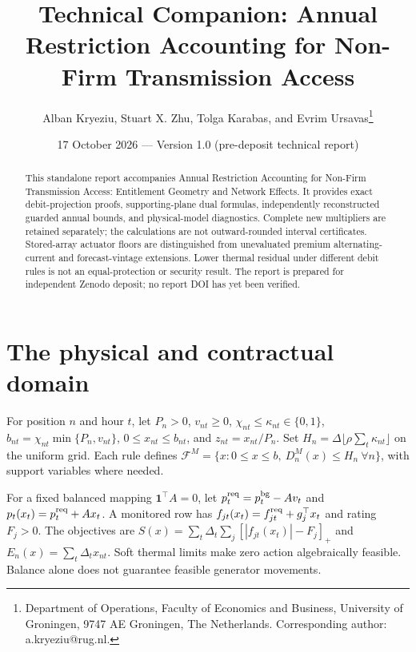 \documentclass[11pt]{article}
\title{Technical Companion: Annual Restriction Accounting for Non-Firm Transmission Access}
\author{Alban Kryeziu, Stuart X. Zhu, Tolga Karabas, and Evrim Ursavas\thanks{Department of Operations, Faculty of Economics and Business, University of Groningen, 9747 AE Groningen, The Netherlands. Corresponding author: a.kryeziu@rug.nl.}}
\date{17 October 2026 --- Version 1.0 (pre-deposit technical report)}
\newcommand{\one}{\mathbf1}
\newcommand{\F}{\mathcal F}
\begin{document}
\maketitle
\begin{abstract}
This standalone report accompanies Annual Restriction Accounting for Non-Firm Transmission Access: Entitlement Geometry and Network Effects. It provides exact debit-projection proofs, supporting-plane dual formulas, independently reconstructed guarded annual bounds, and physical-model diagnostics. Complete new multipliers are retained separately; the calculations are not outward-rounded interval certificates. Stored-array actuator floors are distinguished from unevaluated premium alternating-current and forecast-vintage extensions. Lower thermal residual under different debit rules is not an equal-protection or security result. The report is prepared for independent Zenodo deposit; no report DOI has yet been verified.
\end{abstract}
\section{The physical and contractual domain}
For position $n$ and hour $t$, let $P_n>0$, $v_{nt}\geq0$, $\chi_{nt}\leq\kappa_{nt}\in\{0,1\}$, $b_{nt}=\chi_{nt}\min\{P_n,v_{nt}\}$, $0\leq x_{nt}\leq b_{nt}$, and $z_{nt}=x_{nt}/P_n$. Set $H_n=\Delta\lfloor\rho\sum_t\kappa_{nt}\rfloor$ on the uniform grid. Each rule defines $\F^M=\{x:0\leq x\leq b,\ D_n^M(x)\leq H_n\ \forall n\}$, with support variables where needed.

For a fixed balanced mapping $\one^\top A=0$, let $p_t^{\rm req}=p_t^{\rm bg}-Av_t$ and $p_t(x_t)=p_t^{\rm req}+Ax_t$. A monitored row has $f_{jt}(x_t)=f_{jt}^{\rm req}+g_j^\top x_t$ and rating $F_j>0$. The objectives are $S(x)=\sum_t\Delta_t\sum_j[|f_{jt}(x_t)|-F_j]_+$ and $E_n(x)=\sum_t\Delta_tx_{nt}$. Soft thermal limits make zero action algebraically feasible. Balance alone does not guarantee feasible generator movements.
\end{document}
